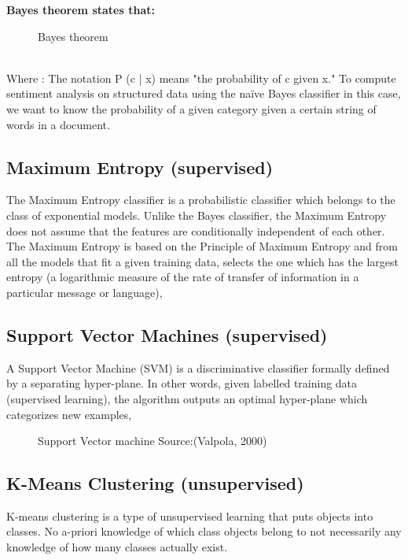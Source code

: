 \textbf{Bayes theorem states that:}
\begin{figure}[h]
  \centering
  \caption[Vector graphics example]%
  {Bayes theorem}
  \label{fig:ALAP:sm3}
\end{figure}

\leavevmode\\

Where : The notation P (c | x) means "the probability of c given x."
To compute sentiment analysis on structured data using the naïve Bayes classifier in this case, we
want to know the probability of a given category given a certain string of words in a document.

\subsection{Maximum Entropy (supervised)}
The Maximum Entropy classifier is a probabilistic classifier which belongs to the class of
exponential models. Unlike the Bayes classifier, the Maximum Entropy does not assume that the
features are conditionally independent of each other. The Maximum Entropy is based on the
Principle of Maximum Entropy and from all the models that fit a given training data, selects the
one which has the largest entropy (a logarithmic measure of the rate of transfer of information in
a particular message or language), \cite{ref19}


\subsection{Support Vector Machines (supervised)}
A Support Vector Machine (SVM) is a discriminative classifier formally defined by a separating
hyper-plane. In other words, given labelled training data (supervised learning), the algorithm
outputs an optimal hyper-plane which categorizes new examples, \cite{ref30}

\begin{figure}[h]
  \centering
  \caption[Vector graphics example]%
  {Support Vector machine Source:(Valpola, 2000)}
  \label{fig:ALAP:sm3}
\end{figure}

\clearpage
\subsection{K-Means Clustering (unsupervised)}
K-means clustering is a type of unsupervised learning that puts objects into classes. No a-priori
knowledge of which class objects belong to not necessarily any knowledge of how many classes
actually exist.

